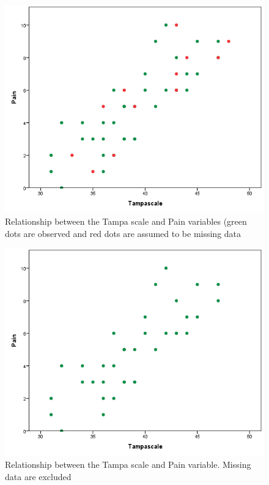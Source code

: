 \documentclass[]{book}
\begin{document}
\begin{figure}

{\centering \includegraphics[width=0.9\linewidth]{images/fig3.2} 

}

\caption{ Relationship between the Tampa scale and Pain variables (green dots are observed and red dots are assumed to be missing data}\label{fig:fig51}
\end{figure}

\begin{figure}

{\centering \includegraphics[width=0.9\linewidth]{images/fig3.3} 

}

\caption{Relationship between the Tampa scale and Pain variable. Missing data are excluded}\label{fig:fig52}
\end{figure}
\end{document}
